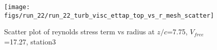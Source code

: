 \begin{figure}[H]
\centering
\texttt{[image: figs/run\_22/run\_22\_turb\_visc\_ettap\_top\_vs\_r\_mesh\_scatter]}
\caption{Scatter plot of reynolds stress term vs radius at $z/c$=7.75, $V_{free}$=17.27, station3}
\label{fig:run_22_turb_visc_ettap_top_vs_r_mesh_scatter}
\end{figure}


